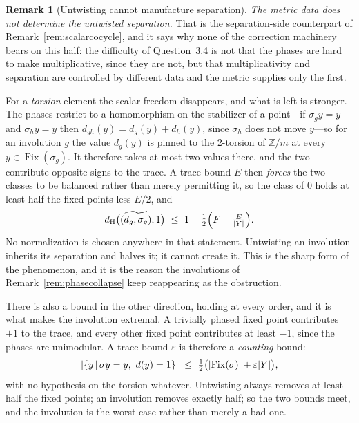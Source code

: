 \documentclass[11pt]{amsart}
\theoremstyle{definition}
\newtheorem{remark}[theorem]{Remark}
\theoremstyle{plain}
\newcommand{\Z}{\mathbb Z}
\newcommand{\Fix}{\operatorname{Fix}}
\newcommand{\eps}{\varepsilon}
\newcommand{\distH}{d_{\mathrm H}}
\DeclarePairedDelimiter{\abs}{\lvert}{\rvert}
\newcommand{\set}[1]{\left\{#1\right\}}
\newcommand{\suchthat}{\,\middle|\,}
\begin{document}
\begin{remark}[Untwisting cannot manufacture separation]
\emph{The metric data does not determine the untwisted separation.}  That is the separation-side counterpart of Remark~\ref{rem:scalarcocycle}, and it says why none of the correction machinery bears on this half: the difficulty of Question~3.4 is not that the phases are hard to make multiplicative, since they are not, but that multiplicativity and separation are controlled by different data and the metric supplies only the first.

For a \emph{torsion} element the scalar freedom disappears, and what is left is stronger.  The phases restrict to a homomorphism on the stabilizer of a point---if \(\sigma_g y=y\) and \(\sigma_h y=y\) then \(d_{gh}(y)=d_g(y)+d_h(y)\), since \(\sigma_h\) does not move \(y\)---so for an involution \(g\) the value \(d_g(y)\) is pinned to the \(2\)-torsion of \(\Z/m\) at every \(y\in\Fix(\sigma_g)\).  It therefore takes at most two values there, and the two contribute opposite signs to the trace.  A trace bound \(E\) then \emph{forces} the two classes to be balanced rather than merely permitting it, so the class of \(0\) holds at least half the fixed points less \(E/2\), and
\[
 \distH\bigl(\widetilde{(d_g,\sigma_g)},1\bigr)\ \leq\ 1-\tfrac12\Bigl(F-\tfrac{E}{\abs Y}\Bigr).
\]
No normalization is chosen anywhere in that statement.  Untwisting an involution inherits its separation and halves it; it cannot create it.  This is the sharp form of the phenomenon, and it is the reason the involutions of Remark~\ref{rem:phasecollapse} keep reappearing as the obstruction.

There is also a bound in the other direction, holding at every order, and it is what makes the involution extremal.  A trivially phased fixed point contributes \(+1\) to the trace, and every other fixed point contributes at least \(-1\), since the phases are unimodular.  A trace bound \(\eps\) is therefore a \emph{counting} bound:
\[
 \abs{\set{y\suchthat\sigma y=y,\ d(y)=1}}\ \leq\ \tfrac12\bigl(\abs{\Fix(\sigma)}+\eps\abs Y\bigr),
\]
with no hypothesis on the torsion whatever.  Untwisting always removes at least half the fixed points; an involution removes exactly half; so the two bounds meet, and the involution is the worst case rather than merely a bad one.


\end{remark}
\end{document}
